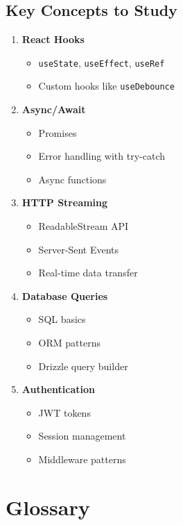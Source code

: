 \documentclass[11pt,a4paper]{article}
\begin{document}
\subsection{Key Concepts to Study}

\begin{enumerate}
    \item \textbf{React Hooks}
    \begin{itemize}
        \item \texttt{useState}, \texttt{useEffect}, \texttt{useRef}
        \item Custom hooks like \texttt{useDebounce}
    \end{itemize}
    
    \item \textbf{Async/Await}
    \begin{itemize}
        \item Promises
        \item Error handling with try-catch
        \item Async functions
    \end{itemize}
    
    \item \textbf{HTTP Streaming}
    \begin{itemize}
        \item ReadableStream API
        \item Server-Sent Events
        \item Real-time data transfer
    \end{itemize}
    
    \item \textbf{Database Queries}
    \begin{itemize}
        \item SQL basics
        \item ORM patterns
        \item Drizzle query builder
    \end{itemize}
    
    \item \textbf{Authentication}
    \begin{itemize}
        \item JWT tokens
        \item Session management
        \item Middleware patterns
    \end{itemize}
\end{enumerate}


\section{Glossary}
\end{document}
